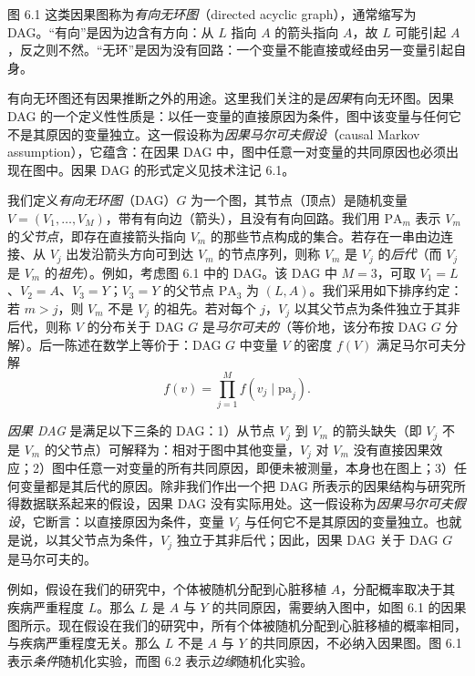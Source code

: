 图 6.1 这类因果图称为\emph{有向无环图}（directed acyclic graph），通常缩写为 DAG。“有向”是因为边含有方向：从 $L$ 指向 $A$ 的箭头指向 $A$，故 $L$ 可能引起 $A$，反之则不然。“无环”是因为没有回路：一个变量不能直接或经由另一变量引起自身。

有向无环图还有因果推断之外的用途。这里我们关注的是\emph{因果}有向无环图。因果 DAG 的一个定义性性质是：以任一变量的直接原因为条件，图中该变量与任何它不是其原因的变量独立。这一假设称为\emph{因果马尔可夫假设}（causal Markov assumption），它蕴含：在因果 DAG 中，图中任意一对变量的共同原因也必须出现在图中。因果 DAG 的形式定义见技术注记 6.1。

\begin{techpoint}[因果有向无环图]
我们定义\emph{有向无环图}（DAG）$G$ 为一个图，其节点（顶点）是随机变量 $V=(V_1,\ldots,V_M)$，带有有向边（箭头），且没有有向回路。我们用 $\mathrm{PA}_m$ 表示 $V_m$ 的\emph{父节点}，即存在直接箭头指向 $V_m$ 的那些节点构成的集合。若存在一串由边连接、从 $V_j$ 出发沿箭头方向可到达 $V_m$ 的节点序列，则称 $V_m$ 是 $V_j$ 的\emph{后代}（而 $V_j$ 是 $V_m$ 的\emph{祖先}）。例如，考虑图 6.1 中的 DAG。该 DAG 中 $M=3$，可取 $V_1=L$、$V_2=A$、$V_3=Y$；$V_3=Y$ 的父节点 $\mathrm{PA}_3$ 为 $(L,A)$。我们采用如下排序约定：若 $m>j$，则 $V_m$ 不是 $V_j$ 的祖先。若对每个 $j$，$V_j$ 以其父节点为条件独立于其非后代，则称 $V$ 的分布关于 DAG $G$ 是\emph{马尔可夫的}（等价地，该分布按 DAG $G$ 分解）。后一陈述在数学上等价于：DAG $G$ 中变量 $V$ 的密度 $f(V)$ 满足马尔可夫分解
\[
f(v)=\prod_{j=1}^{M} f(v_j\mid \mathrm{pa}_j).
\]

\emph{因果 DAG} 是满足以下三条的 DAG：1）从节点 $V_j$ 到 $V_m$ 的箭头缺失（即 $V_j$ 不是 $V_m$ 的父节点）可解释为：相对于图中其他变量，$V_j$ 对 $V_m$ 没有直接因果效应；2）图中任意一对变量的所有共同原因，即便未被测量，本身也在图上；3）任何变量都是其后代的原因。除非我们作出一个把 DAG 所表示的因果结构与研究所得数据联系起来的假设，因果 DAG 没有实际用处。这一假设称为\emph{因果马尔可夫假设}，它断言：以直接原因为条件，变量 $V_j$ 与任何它不是其原因的变量独立。也就是说，以其父节点为条件，$V_j$ 独立于其非后代；因此，因果 DAG 关于 DAG $G$ 是马尔可夫的。
\end{techpoint}

例如，假设在我们的研究中，个体被随机分配到心脏移植 $A$，分配概率取决于其疾病严重程度 $L$。那么 $L$ 是 $A$ 与 $Y$ 的共同原因，需要纳入图中，如图 6.1 的因果图所示。现在假设在我们的研究中，所有个体被随机分配到心脏移植的概率相同，与疾病严重程度无关。那么 $L$ 不是 $A$ 与 $Y$ 的共同原因，不必纳入因果图。图 6.1 表示\emph{条件}随机化实验，而图 6.2 表示\emph{边缘}随机化实验。

